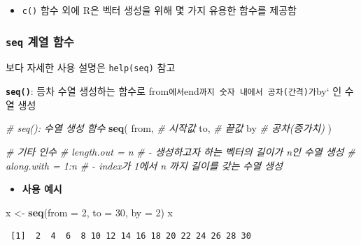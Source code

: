 \documentclass[
  11pt,
]{krantz}
\makeatletter
\newenvironment{Shaded}{\begin{snugshade}}{\end{snugshade}}
\newcommand{\CommentTok}[1]{\textcolor[rgb]{0.37,0.37,0.37}{\textit{#1}}}
\newcommand{\DataTypeTok}[1]{\textcolor[rgb]{0.27,0.27,0.27}{#1}}
\newcommand{\DecValTok}[1]{\textcolor[rgb]{0.06,0.06,0.06}{#1}}
\newcommand{\KeywordTok}[1]{\textcolor[rgb]{0.27,0.27,0.27}{\textbf{#1}}}
\newcommand{\NormalTok}[1]{#1}
\newcommand{\StringTok}[1]{\textcolor[rgb]{0.5,0.5,0.5}{#1}}
\providecommand{\tightlist}{%
  \setlength{\itemsep}{0pt}\setlength{\parskip}{0pt}}
\newenvironment{kframe}{%
\medskip{}
\setlength{\fboxsep}{.8em}
 \def\at@end@of@kframe{}%
 \ifinner\ifhmode%
  \def\at@end@of@kframe{\end{minipage}}%
  \begin{minipage}{\columnwidth}%
 \fi\fi%
 \def\FrameCommand##1{\hskip\@totalleftmargin \hskip-\fboxsep
 \colorbox{shadecolor}{##1}\hskip-\fboxsep
     \hskip-\linewidth \hskip-\@totalleftmargin \hskip\columnwidth}%
 \MakeFramed {\advance\hsize-\width
   \@totalleftmargin\z@ \linewidth\hsize
   \@setminipage}}%
 {\par\unskip\endMakeFramed%
 \at@end@of@kframe}
\renewenvironment{quote}{\begin{kframe}}{\end{kframe}}
\makeatother
\begin{document}
\begin{itemize}
\tightlist
\item
  \texttt{c()} 함수 외에 R은 벡터 생성을 위해 몇 가지 유용한 함수를 제공함
\end{itemize}

\hypertarget{fun-seq}{%
\subsubsection*{\texorpdfstring{\textbf{\texttt{seq}} 계열 함수}{seq 계열 함수}}\label{fun-seq}}


\begin{quote}
보다 자세한 사용 설명은 \texttt{help(seq)} 참고
\end{quote}

\textbf{\texttt{seq()}}: 등차 수열 생성하는 함수로 from\texttt{에서}end\texttt{까지\ 숫자\ 내에서\ 공차(간격)가}by` 인 수열 생성

\footnotesize

\begin{Shaded}
\begin{Highlighting}[]
\CommentTok{# seq(): 수열 생성 함수}
\KeywordTok{seq}\NormalTok{(}
\NormalTok{  from, }\CommentTok{# 시작값}
\NormalTok{  to,   }\CommentTok{# 끝값}
\NormalTok{  by    }\CommentTok{# 공차(증가치)}
\NormalTok{)}

\CommentTok{# 기타 인수}
\CommentTok{# length.out = n}
\CommentTok{#   - 생성하고자 하는 벡터의 길이가 n인 수열 생성}
\CommentTok{# along.with = 1:n }
\CommentTok{#   - index가 1에서 n 까지 길이를 갖는 수열 생성}
\end{Highlighting}
\end{Shaded}

\normalsize

\begin{itemize}
\tightlist
\item
  \textbf{사용 예시}
\end{itemize}

\footnotesize

\begin{Shaded}
\begin{Highlighting}[]
\NormalTok{x <-}\StringTok{ }\KeywordTok{seq}\NormalTok{(}\DataTypeTok{from =} \DecValTok{2}\NormalTok{, }\DataTypeTok{to =} \DecValTok{30}\NormalTok{, }\DataTypeTok{by =} \DecValTok{2}\NormalTok{)}
\NormalTok{x }
\end{Highlighting}
\end{Shaded}

\begin{verbatim}
 [1]  2  4  6  8 10 12 14 16 18 20 22 24 26 28 30
\end{verbatim}
\end{document}
